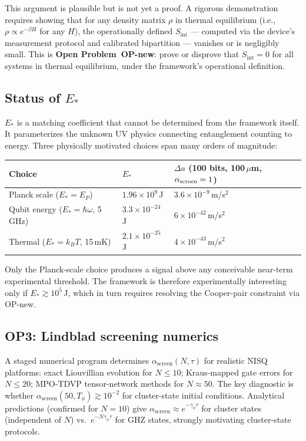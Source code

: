 \documentclass[11pt]{article}
\begin{document}
This argument is plausible but is not yet a proof.  A rigorous demonstration requires showing
that for any density matrix $\rho$ in thermal equilibrium (i.e., $\rho \propto e^{-\beta H}$
for any $H$), the operationally defined $S_{\mathrm{int}}$ --- computed via the device's
measurement protocol and calibrated bipartition --- vanishes or is negligibly small.
This is \textbf{Open Problem~OP-new}: prove or disprove that $S_{\mathrm{int}} = 0$ for
all systems in thermal equilibrium, under the framework's operational definition.

\subsection{Status of $E_*$}

$E_*$ is a matching coefficient that cannot be determined from the framework itself.
It parameterizes the unknown UV physics connecting entanglement counting to energy.
Three physically motivated choices span many orders of magnitude:

\begin{center}\small
\begin{tabular}{@{}lll@{}}
\toprule
Choice & $E_*$ & $\Delta a$ (100 bits, 100\,$\mu$m, $\alpha_{\rm screen}=1$)\\
\midrule
Planck scale ($E_* = E_P$) & $1.96\times10^9$\,J & $3.6\times10^{-9}$\,m/s$^2$ \\
Qubit energy ($E_* = \hbar\omega$, 5\,GHz) & $3.3\times10^{-24}$\,J & $6\times10^{-42}$\,m/s$^2$ \\
Thermal ($E_* = k_BT$, 15\,mK) & $2.1\times10^{-25}$\,J & $4\times10^{-43}$\,m/s$^2$ \\
\bottomrule
\end{tabular}
\end{center}

Only the Planck-scale choice produces a signal above any conceivable near-term experimental
threshold.  The framework is therefore experimentally interesting only if $E_* \gtrsim 10^5$\,J,
which in turn requires resolving the Cooper-pair constraint via OP-new.

\subsection{OP3: Lindblad screening numerics}

A staged numerical program determines $\alpha_{\mathrm{screen}}(N,\tau)$ for realistic
NISQ platforms: exact Liouvillian evolution for $N \leq 10$; Kraus-mapped gate errors
for $N \leq 20$; MPO-TDVP tensor-network methods for $N \approx 50$.  The key diagnostic
is whether $\alpha_{\mathrm{screen}}(50, T_\phi) \gtrsim 10^{-2}$ for cluster-state initial
conditions.  Analytical predictions (confirmed for $N=10$) give $\alpha_{\mathrm{screen}}
\approx e^{-\gamma_\phi\tau}$ for cluster states (independent of $N$) vs.\ $e^{-N\gamma_\phi\tau}$
for GHZ states, strongly motivating cluster-state protocols.
\end{document}
